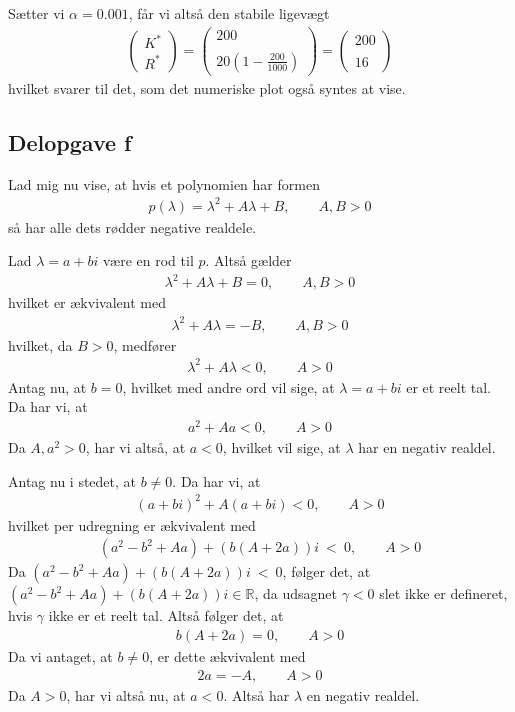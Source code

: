 \documentclass[12pt]{article}
\begin{document}
Sætter vi $\alpha = 0.001$, får vi altså den stabile ligevægt
\begin{align}
\begin{pmatrix}
K^* \\ R^* 
\end{pmatrix} = \begin{pmatrix}
200 \\ \\
20\left( 1 - \frac{200}{1000} \right)
\end{pmatrix} = \begin{pmatrix}
200 \\ \\
16
\end{pmatrix}
\end{align}
hvilket svarer til det, som det numeriske plot også syntes at vise.

\subsection{Delopgave f}

Lad mig nu vise, at hvis et polynomien har formen
\begin{align}
p(\lambda) = \lambda^2 + A\lambda + B, \qquad A,B >0
\end{align}
så har alle dets rødder negative realdele. 

Lad $\lambda = a + b i$ være en rod til $p$. Altså gælder
\begin{align}
\lambda^2 + A\lambda + B = 0, \qquad A,B >0
\end{align}
hvilket er ækvivalent med
\begin{align}
\lambda^2 + A\lambda = -B, \qquad A,B >0
\end{align}
hvilket, da $B>0$, medfører
\begin{align}
\lambda^2 + A\lambda < 0, \qquad A >0
\end{align}
Antag nu, at $b=0$, hvilket med andre ord vil sige, at $\lambda = a + b i$ er et reelt tal. Da har vi, at 
\begin{align}
a^2 + Aa < 0, \qquad A >0
\end{align}
Da $A, a^2>0$, har vi altså, at $a<0$, hvilket vil sige, at $\lambda$ har en negativ realdel.

Antag nu i stedet, at $b\neq 0$. Da har vi, at 
\begin{align}
(a + bi)^2 + A(a + bi) < 0, \qquad A >0
\end{align}
hvilket per udregning er ækvivalent med
\begin{align}
(a^2 - b^2 + Aa) + (b(A + 2a))i\ <\ 0, \qquad A >0
\end{align}
Da $(a^2 - b^2 + Aa) + (b(A + 2a))i\ <\ 0$, følger det, at $(a^2 - b^2 + Aa) + (b(A + 2a))i \in \mathbb{R}$, da udsagnet $\gamma < 0$ slet ikke er defineret, hvis $\gamma$ ikke er et reelt tal. Altså følger det, at
\begin{align}
b(A + 2a) = 0, \qquad A >0
\end{align}
Da vi antaget, at $b\neq 0$, er dette ækvivalent med
\begin{align}
2a = -A, \qquad A >0
\end{align}
Da $A>0$, har vi altså nu, at $a<0$. Altså har $\lambda$ en negativ realdel.
\end{document}
